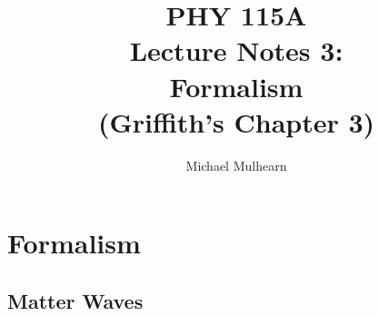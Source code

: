 \documentclass[12pt]{book}
\begin{document}
\newcommand{\ihbar}{\ensuremath{i \hbar}}
\newcommand{\Pss}{\ensuremath{\Psi^*}}
\newcommand{\dPsidt}{\ensuremath{ \frac{\partial \Psi}{\partial t} }}
\newcommand{\dPsidx}{\ensuremath{ \frac{\partial \Psi}{\partial x} }}
\newcommand{\ddPsidx}{\ensuremath{ \frac{\partial^2 \Psi}{\partial x^2} }}
\newcommand{\dPssdt}{\ensuremath{ \frac{\partial \Psi^*}{\partial t} }}
\newcommand{\dPssdx}{\ensuremath{ \frac{\partial \Psi^*}{\partial x} }}
\newcommand{\ddPssdx}{\ensuremath{ \frac{\partial^2 \Psi^*}{\partial x^2} }}

\newcommand{\dphidt}{\ensuremath{ \frac{d \phi}{dt} }}
\newcommand{\dpsidx}{\ensuremath{ \frac{d \psi}{dx} }}
\newcommand{\ddpsidx}{\ensuremath{ \frac{d^2 \psi}{dx^2} }}


\title{PHY 115A \\ Lecture Notes 3: \\ 
Formalism \\
(Griffith's Chapter 3)}
\author{Michael Mulhearn}

\maketitle

\setcounter{chapter}{2}
\chapter{Formalism}

\section{Matter Waves}
\end{document}
